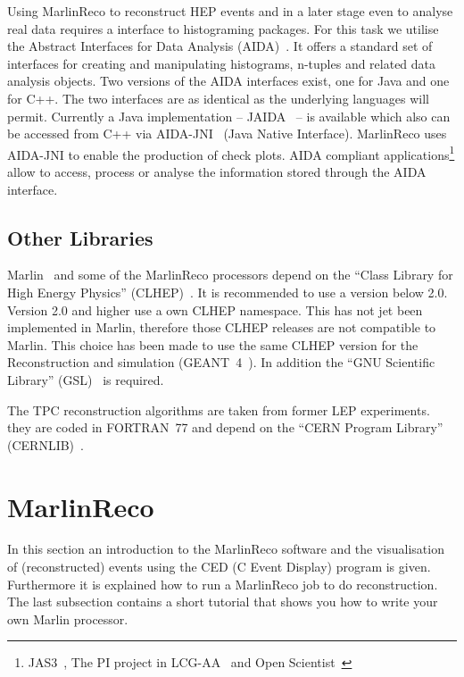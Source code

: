 Using MarlinReco to reconstruct HEP events and in a later stage even to
analyse real data requires a interface to histograming packages.
For this task we utilise the Abstract Interfaces for Data Analysis
(AIDA)~\cite{ref_aida}. It offers a standard set of interfaces for creating
and manipulating histograms, n-tuples and related data analysis objects.
Two versions of the AIDA interfaces exist, one for Java and
one for C++. The two interfaces are as identical as the underlying
languages will permit. Currently a Java implementation --
JAIDA~\cite{ref_jaida} -- is available which also can be accessed from C++
via AIDA-JNI~\cite{ref_aidajni} (Java Native Interface).
MarlinReco uses AIDA-JNI to enable the production of check plots.
AIDA compliant applications\footnote{
      JAS3~\cite{ref_jas}, The PI project in LCG-AA~\cite{ref_pi} and
      Open Scientist~\cite{ref_OS}}
allow to access, process or analyse the information
stored through the AIDA interface.

\subsection{Other Libraries} \label{sec:otherlibs}

Marlin~\cite{ref_marlin} and some of the MarlinReco processors depend on the
``Class Library for High Energy Physics'' (CLHEP)~\cite{ref_clhep}.
It is recommended to use a version below 2.0. Version 2.0 and higher use a
own CLHEP namespace. This has not jet been implemented in Marlin, therefore those
CLHEP releases are not compatible to Marlin. This choice has been
made to use the same CLHEP version for the Reconstruction and simulation
(GEANT~4~\cite{ref_geant4}). In addition the ``GNU Scientific Library''
(GSL)~\cite{ref_gsl} is required.

The TPC reconstruction algorithms are taken from former LEP experiments.
they are coded in FORTRAN~77 and depend on the ``CERN Program Library''
(CERNLIB)~\cite{ref_cernlib}.

\section{MarlinReco}

In this section an introduction to the MarlinReco software and the
visualisation of (reconstructed) events using the
CED (C Event Display) program is given. Furthermore it is explained how to
run a MarlinReco job to do reconstruction. The last subsection
contains a short tutorial that shows you how to write your own Marlin
processor.

